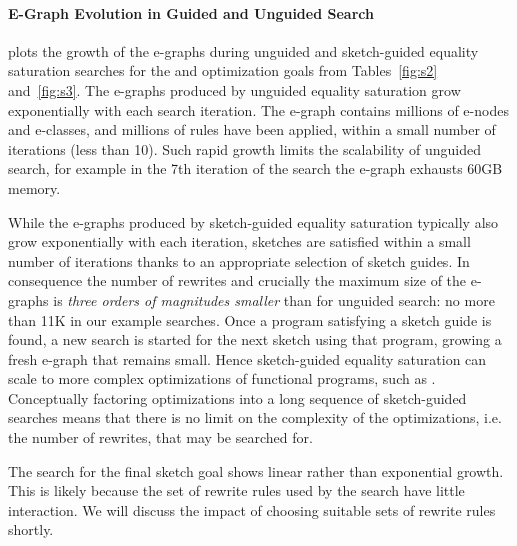 \paragraph{E-Graph Evolution in Guided and Unguided Search}
 plots the growth of the e-graphs during unguided and sketch-guided equality saturation searches for the \blocking{} and \parallel{} optimization goals from Tables~\ref{fig:s2} and~\ref{fig:s3}.
The e-graphs produced by unguided equality saturation grow exponentially with each search iteration. The e-graph contains millions of e-nodes and e-classes, and millions of rules have been applied, within a small number of iterations (less than 10). Such rapid growth limits the scalability of unguided search, for example in the 7th iteration of the \parallel{} search the e-graph exhausts 60GB memory.

While the e-graphs produced by sketch-guided equality saturation typically also grow exponentially with each iteration, sketches are satisfied within a small number of iterations thanks to an appropriate selection of sketch guides.
In consequence the number of rewrites and crucially the maximum size of the e-graphs is \emph{three orders of magnitudes smaller} than for unguided search: no more than 11K in our example searches.
Once a program satisfying a sketch guide is found, a new search is started for the next sketch using that program, growing a fresh e-graph that remains small.
Hence sketch-guided equality saturation can scale to more complex optimizations of functional programs, such as \parallel{}. 
Conceptually factoring optimizations into a long sequence of sketch-guided searches means that there is no limit on the complexity of the optimizations, i.e. the number of rewrites, that may be searched for.

The search for the final \parallel{} sketch goal shows linear rather than exponential growth. This is likely because the set of rewrite rules used by the search have little interaction. We will discuss the impact of choosing suitable sets of rewrite rules shortly.


